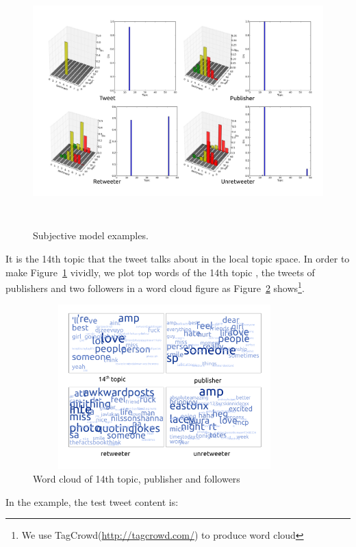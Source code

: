 \documentclass[preprint,times]{elsarticle}
\begin{document}
\begin{figure}[htb]
\centering%
\includegraphics[width=6.0in,height=3.8in]{tweets10.pdf}
\caption{Subjective model examples.}
\label{fig:graph4}
\end{figure}
It is the 14th topic that the tweet talks about in the local topic space.
In order to make Figure~\ref{fig:graph4} vividly, we plot top words of the 14th topic , the tweets of publishers and two followers in a word cloud figure as Figure~\ref{fig:graph5} shows\footnote{We use TagCrowd(\url{http://tagcrowd.com/}) to produce word cloud}.
\begin{figure}[htb]
\centering
\includegraphics[width=4.0in,height=2.5in]{text_cloud.pdf}
\caption{Word cloud of 14th topic, publisher and followers}
\label{fig:graph5}
\end{figure}
In the example, the test tweet content is:\\
\end{document}
